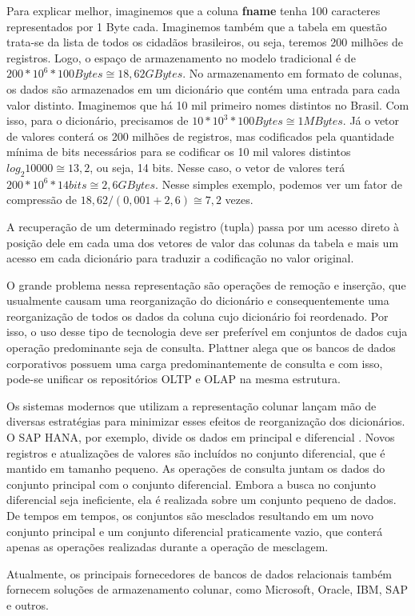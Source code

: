Para explicar melhor, imaginemos que a coluna \textbf{fname} tenha 100 caracteres representados por 1 Byte cada. Imaginemos também que a tabela em questão trata-se da lista de todos os cidadãos brasileiros, ou seja, teremos 200 milhões de registros. Logo, o espaço de armazenamento no modelo tradicional é de $ 200*10^6 * 100 Bytes \cong 18,62 GBytes  $. No armazenamento em formato de colunas, os dados são armazenados em um dicionário que contém uma entrada para cada valor distinto. Imaginemos que há 10 mil primeiro nomes distintos no Brasil. Com isso, para o dicionário, precisamos de $ 10*10^3 * 100 Bytes \cong 1 MBytes  $. Já o vetor de valores conterá os 200 milhões de registros, mas codificados pela quantidade mínima de bits necessários para se codificar os 10 mil valores distintos $ log_2 10000 \cong 13,2  $, ou seja, 14 bits. Nesse caso, o vetor de valores terá $ 200*10^6 * 14 bits \cong 2,6 GBytes  $. Nesse simples exemplo, podemos ver um fator de compressão de $ 18,62 / (0,001 + 2,6) \cong 7,2 $ vezes.

A recuperação de um determinado registro (tupla) passa por um acesso direto à posição dele em cada uma dos vetores de valor das colunas da tabela e mais um acesso em cada dicionário para traduzir a codificação no valor original.

O grande problema nessa representação são operações de remoção e inserção, que usualmente causam uma reorganização do dicionário e consequentemente uma reorganização de todos os dados da coluna cujo dicionário foi reordenado. Por isso, o uso desse tipo de tecnologia deve ser preferível em conjuntos de dados cuja operação predominante seja de consulta. Plattner \cite{plattner2009common} alega que os bancos de dados corporativos possuem uma carga predominantemente de consulta e com isso, pode-se unificar os repositórios OLTP e OLAP na mesma estrutura. 

Os sistemas modernos que utilizam a representação colunar lançam mão de diversas estratégias para minimizar esses efeitos de reorganização dos dicionários. O SAP HANA, por exemplo, divide os dados em principal e diferencial \cite{plattner2012memory}. Novos registros e atualizações de valores são incluídos no conjunto diferencial, que é mantido em tamanho pequeno. As operações de consulta juntam os dados do conjunto principal com o conjunto diferencial. Embora a busca no conjunto diferencial seja ineficiente, ela é realizada sobre um conjunto pequeno de dados. De tempos em tempos, os conjuntos são mesclados resultando em um novo conjunto principal e um conjunto diferencial praticamente vazio, que conterá apenas as operações realizadas durante a operação de mesclagem.

Atualmente, os principais fornecedores de bancos de dados relacionais também fornecem soluções de armazenamento colunar, como Microsoft, Oracle, IBM, SAP e outros.  




